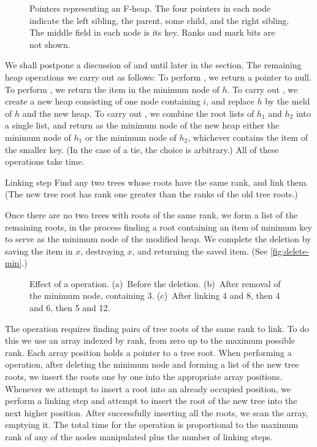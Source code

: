 \begin{figure}
    \caption{Pointers representing an F-heap. The four pointers in each node indicate
    the left sibling, the parent, some child, and the right sibling. The middle field
    in each node is its key. Ranks and mark bits are not shown.}
    \label{fig:pointers}
\end{figure}

We shall postpone a discussion of  and  until later in
the section. The remaining heap operations we carry out as follows: To perform
, we return a pointer to null. To perform , we
return the item in the minimum node of \(h\). To carry out , we
create a new heap consisting of one node containing \(i\), and replace \(h\) by the
meld of \(h\) and the new heap. To carry out , we combine the
root lists of \(h_1\) and \(h_2\) into a single list, and return as the minimum node
of the new heap either the minimum node of \(h_1\) or the minimum node of \(h_2\),
whichever contains the item of the smaller key. (In the case of a tie, the choice is
arbitrary.) All of these operations take  time.

\begin{step}{Linking step}
    Find any two trees whose roots have the same rank, and link them. (The new tree
    root has rank one greater than the ranks of the old tree roots.)
\end{step}

Once there are no two trees with roots of the same rank, we form a list of the
remaining roots, in the process finding a root containing an item of minimum key to
serve as the minimum node of the modified heap. We complete the deletion by saving
the item in \(x\), destroying \(x\), and returning the saved item. (See
\autoref{fig:delete-min}.)

\begin{figure}
    \caption{Effect of a  operation. (a)~Before the deletion.
    (b)~After removal of the minimum node, containing 3. (c)~After linking 4 and 8,
    then 4 and 6, then 5 and 12.}
    \label{fig:delete-min}
\end{figure}

The  operation requires finding pairs of tree roots of the same rank
to link. To do this we use an array indexed by rank, from zero up to the maximum
possible rank. Each array position holds a pointer to a tree root. When performing
a  operation, after deleting the minimum node and forming a list of
the new tree roots, we insert the roots one by one into the appropriate array
positions. Whenever we attempt to insert a root into an already occupied position, we
perform a linking step and attempt to insert the root of the new tree into the next
higher position. After successfully inserting all the roots, we scan the array,
emptying it. The total time for the  operation is proportional to the
maximum rank of any of the nodes manipulated plus the number of linking steps.

